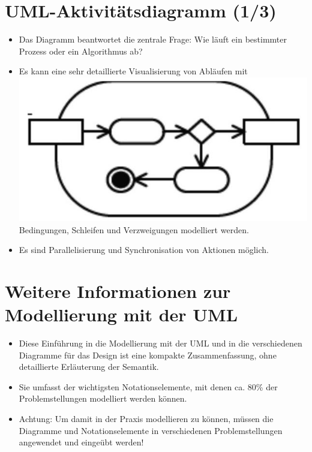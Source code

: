 \documentclass[10pt]{article}
\begin{document}
\section*{UML-Aktivitätsdiagramm (1/3)}
\begin{itemize}
  \item Das Diagramm beantwortet die zentrale Frage: Wie läuft ein bestimmter Prozess oder ein Algorithmus ab?
  \item Es kann eine sehr detaillierte Visualisierung von Abläufen mit\\
\includegraphics[width=\linewidth]{images/2025_01_02_787afb9584031d2940deg-18} Bedingungen, Schleifen und Verzweigungen modelliert werden.
  \item Es sind Parallelisierung und Synchronisation von Aktionen möglich.
\end{itemize}

\section*{Weitere Informationen zur Modellierung mit der UML}
\begin{itemize}
  \item Diese Einführung in die Modellierung mit der UML und in die verschiedenen Diagramme für das Design ist eine kompakte Zusammenfassung, ohne detaillierte Erläuterung der Semantik.
  \item Sie umfasst der wichtigsten Notationselemente, mit denen ca. 80\% der Problemstellungen modelliert werden können.
  \item Achtung: Um damit in der Praxis modellieren zu können, müssen die Diagramme und Notationselemente in verschiedenen Problemstellungen angewendet und eingeübt werden!
\end{itemize}
\end{document}
